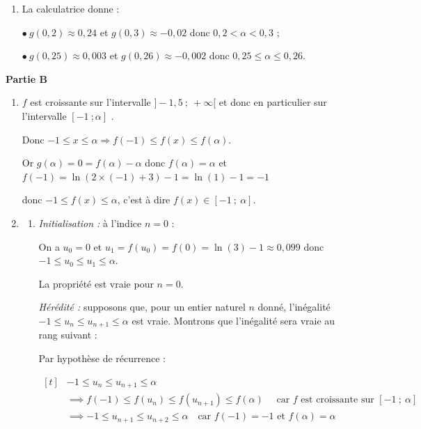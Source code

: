 \documentclass[10pt]{article}
\begin{document}
\begin{enumerate}
\begin{enumerate}
En vertu du corollaire au théorème des valeurs intermédiaires appliqué aux fonctions strictement monotones, l'équation $g(x)=0$ admet une unique solution sur l'intervalle $]-0,5~;~+\infty[$.
	\item La calculatrice donne :
	
$\bullet~$$g(0,2) \approx 0,24$ et $g(0,3) \approx - 0,02$ donc $0,2 < \alpha < 0,3$ ;
	
$\bullet~$$g(0,25) \approx 0,003$ et $g(0,26) \approx - 0,002$ donc $0,25\leqslant\alpha \leqslant 0,26$.
	\end{enumerate}
\end{enumerate}

\bigskip

\textbf{Partie B}

\medskip

\begin{enumerate}
\item $f$ est  croissante sur l'intervalle  $ ]-1,5~;~+\infty[ $  et donc en particulier sur l'intervalle $[-1~; \alpha]$ .

Donc $-1 \leqslant x \leqslant \alpha \Longrightarrow f(-1) \leqslant f(x) \leqslant f(\alpha)$.

Or $g(\alpha ) = 0 = f(\alpha) -\alpha$ donc $ f(\alpha)=\alpha$ et $f(-1) = \ln(2\times(-1)+3)-1= \ln(1) - 1 =- 1$

donc $- 1 \leqslant f(x) \leqslant\alpha $, c'est à dire $f(x) \in [-1~;~\alpha]$.
\item
	\begin{enumerate}
		\item
\emph{Initialisation :} à l'indice $n=0$ :
			
On a  $u_0=0$ et $u_1=f(u_0)=f(0)=\ln(3)-1\approx 0,099$  donc $-1 \leqslant u_0 \leqslant u_1 \leqslant\alpha$.

La propriété est vraie pour $n=0$.

\emph{Hérédité :} supposons que, pour un entier naturel $n$ donné, l'inégalité  $-1 \leqslant u_n \leqslant u_{n+1} \leqslant\alpha$ est vraie. Montrons que l'inégalité sera vraie au rang suivant :

Par hypothèse de récurrence : 

$\begin{aligned}[t]  & -1 \leqslant u_n \leqslant u_{n+1} \leqslant\alpha \\
	&\implies f(-1) \leqslant f(u_n) \leqslant f(u_{n+1}) \leqslant f(\alpha) \quad \text{ car } f \text{ est croissante sur  } [-1~;~\alpha]\\
	&\implies -1\leqslant u_{n+1}\leqslant u_{n+2} \leqslant\alpha  \quad \text{car } f(-1)=-1 \text{ et } f(\alpha)=\alpha\\ \end{aligned}$


\end{enumerate}
\end{enumerate}
\end{document}
